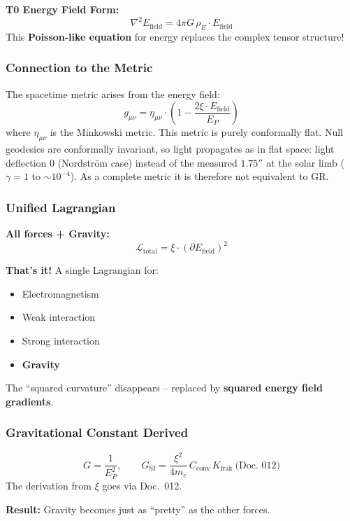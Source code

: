 	\textbf{T0 Energy Field Form:}
	\[
	\boxed{\nabla^2 E_{\text{field}} = 4\pi G \, \rho_E \cdot E_{\text{field}}}
	\]
	This \textbf{Poisson-like equation} for energy replaces the complex tensor structure!
	
	\subsubsection*{Connection to the Metric}
	
	The spacetime metric arises from the energy field:
	\[
	g_{\mu\nu} = \eta_{\mu\nu} \cdot \left(1 - \frac{2\xi \cdot E_{\text{field}}}{E_P}\right)
	\]
	where $\eta_{\mu\nu}$ is the Minkowski metric. This metric is purely conformally flat. Null geodesics are conformally invariant, so light propagates as in flat space: light deflection $0$ (Nordström case) instead of the measured $1.75''$ at the solar limb ($\gamma = 1$ to $\sim 10^{-4}$). As a complete metric it is therefore not equivalent to GR.
	
	\subsubsection*{Unified Lagrangian}
	
	\textbf{All forces + Gravity:}
	\[
	\boxed{\mathcal{L}_{\text{total}} = \xi \cdot (\partial E_{\text{field}})^2}
	\]
	
	\textbf{That's it!} A single Lagrangian for:
	\begin{itemize}
		\item Electromagnetism
		\item Weak interaction
		\item Strong interaction
		\item \textbf{Gravity}
	\end{itemize}
	
	The ``squared curvature'' disappears – replaced by \textbf{squared energy field gradients}.
	
	\subsubsection*{Gravitational Constant Derived}
	\[
	G = \frac{1}{E_P^2}, \qquad G_{\text{SI}} = \frac{\xi^2}{4m_e}\,C_{\text{conv}}\,K_{\text{frak}} \ \text{(Doc.~012)}
	\]
	The derivation from $\xi$ goes via Doc.~012.
	
	\textbf{Result:} Gravity becomes just as ``pretty'' as the other forces.
	
	
	
